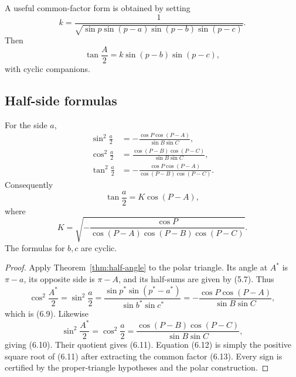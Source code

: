 A useful common-factor form is obtained by setting
\begin{equation}
 k=\frac{1}{\sqrt{\sin p\sin(p-a)\sin(p-b)\sin(p-c)}}.     \tag{6.7}
\end{equation}
Then
\begin{equation}
 \tan\frac A2=k\sin(p-b)\sin(p-c),                         \tag{6.8}
\end{equation}
with cyclic companions.

\subsection{Half-side formulas}

\begin{theorem}
\label{thm:half-side}
For the side \(a\),
\begin{align}
 \sin^2\frac a2
 &=-\frac{\cos P\cos(P-A)}{\sin B\sin C},                 \tag{6.9}\\
 \cos^2\frac a2
 &=\frac{\cos(P-B)\cos(P-C)}{\sin B\sin C},                \tag{6.10}\\
 \tan^2\frac a2
 &=-\frac{\cos P\cos(P-A)}{\cos(P-B)\cos(P-C)}.           \tag{6.11}
\end{align}
Consequently
\begin{equation}
 \tan\frac a2=K\cos(P-A),                                 \tag{6.12}
\end{equation}
where
\begin{equation}
 K=\sqrt{-\frac{\cos P}
 {\cos(P-A)\cos(P-B)\cos(P-C)}}.                          \tag{6.13}
\end{equation}
The formulas for \(b,c\) are cyclic.
\end{theorem}

\begin{proof}
Apply Theorem~\ref{thm:half-angle} to the polar triangle.  Its angle at
\(A^*\) is \(\pi-a\), its opposite side is \(\pi-A\), and its half-sums are
given by (5.7).  Thus
\[
 \cos^2\frac{A^*}{2}=\sin^2\frac a2
 =\frac{\sin p^*\sin(p^*-a^*)}{\sin b^*\sin c^*}
 =-\frac{\cos P\cos(P-A)}{\sin B\sin C},
\]
which is (6.9).  Likewise
\[
 \sin^2\frac{A^*}{2}=\cos^2\frac a2
 =\frac{\cos(P-B)\cos(P-C)}{\sin B\sin C},
\]
giving (6.10).  Their quotient gives (6.11).  Equation (6.12) is simply the
positive square root of (6.11) after extracting the common factor (6.13).
Every sign is certified by the proper-triangle hypotheses and the polar
construction.
\end{proof}

